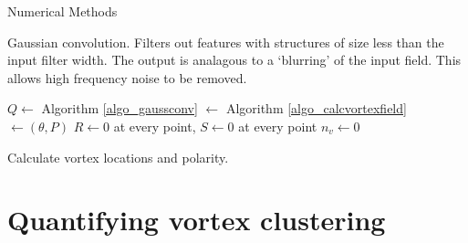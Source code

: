 \begin{chapter}{\label{cha:numerics}Numerical Methods}
\begin{algorithm}[H]
	\caption{Gaussian convolution. Filters out features with structures of size less than the input
	filter width. The output is analagous to a `blurring' of the input field. This allows high frequency noise to be removed.}\label{algo_gaussconv}
	\end{algorithm}


	\begin{algorithm}[H]
	\BlankLine
	$Q\leftarrow$ Algorithm \ref{algo_gaussconv} $\leftarrow$ Algorithm \ref{algo_calcvortexfield} $\leftarrow(\theta,P)$ \;
	$R\leftarrow0$ at every point, $S\leftarrow0$ at every point\;
	$n_v\leftarrow 0$\;


	\caption{Calculate vortex locations and polarity.}\label{algo_calcvortexlocs}
	\end{algorithm}



\section{\label{section:vortexclustering} Quantifying vortex clustering}

\end{chapter}
